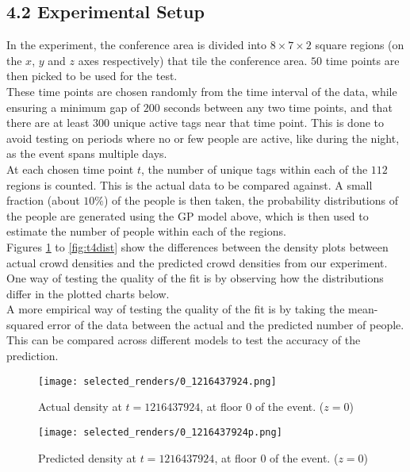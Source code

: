 \documentclass[letterpaper]{article}
\begin{document}
\subsection{4.2  Experimental Setup}

In the experiment, the conference area is divided into $8\times 7 \times 2$ square regions (on the $x$, $y$ and $z$ axes respectively) that tile the conference area. $50$ time points are then picked to be used for the test. \\

These time points are chosen randomly from the time interval of the data, while ensuring a minimum gap of $200$ seconds between any two time points, and that there are at least $300$ unique active tags near that time point. This is done to avoid testing on periods where no or few people are active, like during the night, as the event spans multiple days.\\

At each chosen time point $t$, the number of unique tags within each of the $112$ regions is counted. This is the actual data to be compared against. A small fraction (about $10\%$) of the people is then taken, the probability distributions of the people are generated using the GP model above, which is then used to estimate the number of people within each of the regions. \\

Figures \ref{fig:t1dist} to \ref{fig:t4dist} show the differences between the density plots between actual crowd densities and the predicted crowd densities from our experiment. One way of testing the quality of the fit is by observing how the distributions differ in the plotted charts below. \\

A more empirical way of testing the quality of the fit is by taking the mean-squared error of the data between the actual and the predicted number of people. This can be compared across different models to test the accuracy of the prediction.

\begin{figure}[h!]
  \centering
    \texttt{[image: selected\_renders/0\_1216437924.png]}
  \caption{Actual density at $t=1216437924$, at floor $0$ of the event. ($z = 0$)}
  \label{fig:t1dist}
\end{figure}

\begin{figure}[h!]
  \centering
    \texttt{[image: selected\_renders/0\_1216437924p.png]}
  \caption{Predicted density at $t=1216437924$, at floor $0$ of the event. ($z = 0$)}
  \label{fig:t2dist}
\end{figure}
\end{document}
